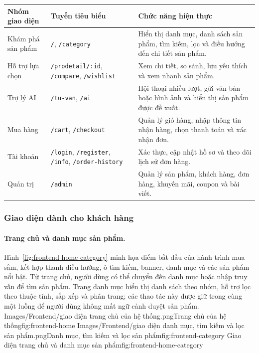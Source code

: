 \begin{breakabletable}
    \centering
    \caption{Ánh xạ các nhóm giao diện Frontend với chức năng chính}
    \label{tab:frontend-interface-map}
    \small
    \renewcommand{\arraystretch}{0.95}
    \begin{tabularx}{\linewidth}{|>{\RaggedRight\arraybackslash}p{}|>{\RaggedRight\arraybackslash}p{}|>{\RaggedRight\arraybackslash}X|}
        \hline
        \textbf{Nhóm giao diện} & \textbf{Tuyến tiêu biểu} & \textbf{Chức năng hiện thực} \\
        \hline
        Khám phá sản phẩm & \texttt{/}, \texttt{/category} & Hiển thị danh mục, danh sách sản phẩm, tìm kiếm, lọc và điều hướng đến chi tiết sản phẩm. \\
        \hline
        Hỗ trợ lựa chọn & \texttt{/prodetail/:id}, \texttt{/compare}, \texttt{/wishlist} & Xem chi tiết, so sánh, lưu yêu thích và xem nhanh sản phẩm. \\
        \hline
        Trợ lý AI & \texttt{/tu-van}, \texttt{/ai} & Hội thoại nhiều lượt, gửi văn bản hoặc hình ảnh và hiển thị sản phẩm được đề xuất. \\
        \hline
        Mua hàng & \texttt{/cart}, \texttt{/checkout} & Quản lý giỏ hàng, nhập thông tin nhận hàng, chọn thanh toán và xác nhận đơn. \\
        \hline
        Tài khoản & \texttt{/login}, \texttt{/register}, \texttt{/info}, \texttt{/order-history} & Xác thực, cập nhật hồ sơ và theo dõi lịch sử đơn hàng. \\
        \hline
        Quản trị & \texttt{/admin} & Quản lý sản phẩm, khách hàng, đơn hàng, khuyến mãi, coupon và bài viết. \\
        \hline
    \end{tabularx}
\end{breakabletable}

\subsubsection{Giao diện dành cho khách hàng}

\paragraph{Trang chủ và danh mục sản phẩm.}

Hình~\ref{fig:frontend-home-category} minh họa điểm bắt đầu của hành trình mua sắm, kết hợp thanh điều hướng, ô tìm kiếm, banner,
danh mục và các sản phẩm nổi bật. Từ trang chủ, người dùng có thể chuyển đến danh mục hoặc nhập
truy vấn để tìm sản phẩm. Trang danh mục hiển thị danh sách theo nhóm, hỗ trợ lọc theo thuộc tính,
sắp xếp và phân trang; các thao tác này được giữ trong cùng một luồng để người dùng không mất ngữ
cảnh duyệt sản phẩm.
\frontendpair
{Images/Frontend/giao diện trang chủ của hệ thống.png}{Trang chủ của hệ thống}{fig:frontend-home}
{Images/Frontend/giao diện danh mục, tìm kiếm và lọc sản phẩm.png}{Danh mục, tìm kiếm và lọc sản phẩm}{fig:frontend-category}
{Giao diện trang chủ và danh mục sản phẩm}{fig:frontend-home-category}


